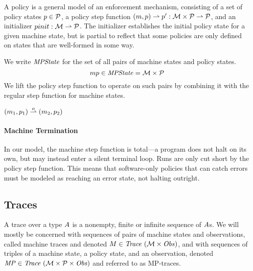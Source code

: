 \documentclass[acmsmall,review,anonymous]{acmart}\settopmatter{printfolios=true,printccs=false,printacmref=false}
\begin{document}
A policy is a general model of an enforcement mechanism, consisting of a
set of policy states \(p \in \mathcal{P}\), a policy step function
\((m, p) \rightharpoonup p' : {\mathcal M} \times \mathcal{P}
\rightharpoonup \mathcal{P}\), and an initializer \(pinit : {\mathcal M} \rightharpoonup
\mathcal{P}\). The initializer establishes the initial policy state for a given
machine state, but is partial to reflect that some policies are only defined
on states that are well-formed in some way.

We write $\mathit{MPState}$ for the set of all pairs of machine states and policy
states.
%
\[mp \in \mathit{MPState} = {\mathcal M} \times \mathcal{P}\]
%
We lift the policy step function to operate on such pairs
by combining it with the regular step function for machine states.

            {\((m_1,p_1) \overset{o}{\rightharpoonup}
               (m_2,p_2)\)}


\paragraph*{Machine Termination}

In our model, the machine step function is total---a program does not halt
on its own, but may instead enter a silent terminal loop. Runs are only cut
short by the policy step function. This means that software-only policies that
can catch errors must be modeled as reaching an error state, not
halting outright.


\subsection{Traces}

A trace over a type $A$ is a nonempty, finite or infinite sequence of
$A$s. We will mostly be concerned with sequences of pairs of machine states
and observations, called machine traces and denoted $M \in \mathit{Trace}~({\mathcal M} \times \mathit{Obs})$,
and with sequences of triples of a machine state, a policy state, and an
observation, denoted $\mathit{MP} \in \mathit{Trace}~({\mathcal M} \times \mathcal{P} \times \mathit{Obs})$ and referred to as MP-traces.
\end{document}
